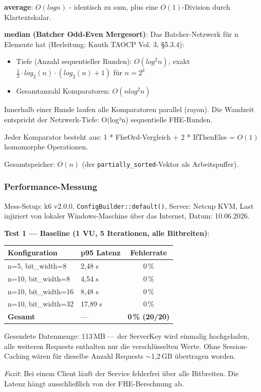\textbf{average}: 
$O(log n)$ - identisch zu sum, plus eine $O(1)$-Division durch Klartextskalar.

\textbf{median (Batcher Odd-Even Mergesort)}:
Das Batcher-Netzwerk für n Elemente hat (Herleitung: Knuth TAOCP Vol. 3, \S5.3.4):
\begin{itemize}
    \item Tiefe (Anzahl sequentieller Runden): $O(log^2n)$, exakt $\frac{1}{2} \cdot log_2(n) \cdot (log_2(n)+1)$ für $n = 2^k$
    \item Gesamtanzahl Komparatoren: $O(n log^2n)$
\end{itemize}\par
Innerhalb einer Runde laufen alle Komparatoren parallel (rayon). Die Wandzeit entspricht der Netzwerk-Tiefe: O(log²n) sequentielle FHE-Runden.\par
Jeder Komparator besteht aus: 1 * FheOrd-Vergleich + 2 * IfThenElse = $O(1)$ homomorphe Operationen.\par
Gesamtspeicher: $O(n)$ (der \verb|partially_sorted|-Vektor als Arbeitspuffer).

\subsubsection{Performance-Messung}
Mess-Setup: k6 v2.0.0, \verb|ConfigBuilder::default()|, Server: Netcup KVM, Last injiziert von lokaler Windows-Maschine über das Internet, Datum: 10.06.2026.\par

\textbf{Test 1 — Baseline (1 VU, 5 Iterationen, alle Bitbreiten)}:\par
\begin{tabular}{||l|l|c||}
    \hline
    \textbf{Konfiguration} & \textbf{p95 Latenz} & \textbf{Fehlerrate} \\
    \hline\hline
    n=5, bit\_width=8 & 2,48 s & 0\,\% \\
    \hline
    n=10, bit\_width=8 & 4,54 s & 0\,\% \\
    \hline
    n=10, bit\_width=16 & 8,48 s & 0\,\% \\
    \hline
    n=10, bit\_width=32 & 17,89 s & 0\,\% \\
    \hline
    \textbf{Gesamt} & — & \textbf{0\,\% (20/20)} \\
    \hline
\end{tabular}\par
Gesendete Datenmenge: 113\,MB — der ServerKey wird einmalig hochgeladen, alle weiteren Requests enthalten nur die verschlüsselten Werte. Ohne Session-Caching wären für dieselbe Anzahl Requests $\sim$1,2\,GB übertragen worden.\par
\textit{Fazit}: Bei einem Client läuft der Service fehlerfrei über alle Bitbreiten. Die Latenz hängt ausschließlich von der FHE-Berechnung ab.\par

